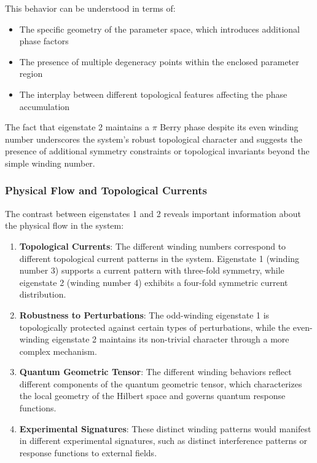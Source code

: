 This behavior can be understood in terms of:
\begin{itemize}
    \item The specific geometry of the parameter space, which introduces additional phase factors
    \item The presence of multiple degeneracy points within the enclosed parameter region
    \item The interplay between different topological features affecting the phase accumulation
\end{itemize}

The fact that eigenstate 2 maintains a $\pi$ Berry phase despite its even winding number underscores the system's robust topological character and suggests the presence of additional symmetry constraints or topological invariants beyond the simple winding number.

\subsubsection{Physical Flow and Topological Currents}

The contrast between eigenstates 1 and 2 reveals important information about the physical flow in the system:

\begin{enumerate}
    \item \textbf{Topological Currents}: The different winding numbers correspond to different topological current patterns in the system. Eigenstate 1 (winding number 3) supports a current pattern with three-fold symmetry, while eigenstate 2 (winding number 4) exhibits a four-fold symmetric current distribution.
    
    \item \textbf{Robustness to Perturbations}: The odd-winding eigenstate 1 is topologically protected against certain types of perturbations, while the even-winding eigenstate 2 maintains its non-trivial character through a more complex mechanism.
    
    \item \textbf{Quantum Geometric Tensor}: The different winding behaviors reflect different components of the quantum geometric tensor, which characterizes the local geometry of the Hilbert space and governs quantum response functions.
    
    \item \textbf{Experimental Signatures}: These distinct winding patterns would manifest in different experimental signatures, such as distinct interference patterns or response functions to external fields.
\end{enumerate}

